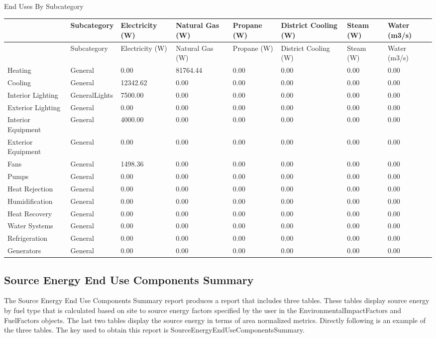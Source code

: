 End Uses By Subcategory

{\scriptsize
\begin{longtable}[c]{>{\raggedright}p{0.75in}>{\raggedright}p{0.75in}>{\raggedright}p{0.75in}>{\raggedright}p{0.75in}>{\raggedright}p{0.75in}>{\raggedright}p{0.75in}>{\raggedright}p{0.75in}>{\raggedright}p{0.75in}}
\toprule
~ & Subcategory & Electricity (W) & Natural Gas (W) & Propane (W) & District Cooling (W) & Steam (W) & Water (m3/s) \tabularnewline
\midrule
\endfirsthead

\toprule
~ & Subcategory & Electricity (W) & Natural Gas (W) & Propane (W) & District Cooling (W) & Steam (W) & Water (m3/s) \tabularnewline
\midrule
\endhead

Heating & General & 0.00 & 81764.44 & 0.00 & 0.00 & 0.00 & 0.00 \tabularnewline
Cooling & General & 12342.62 & 0.00 & 0.00 & 0.00 & 0.00 & 0.00 \tabularnewline
Interior Lighting & GeneralLights & 7500.00 & 0.00 & 0.00 & 0.00 & 0.00 & 0.00 \tabularnewline
Exterior Lighting & General & 0.00 & 0.00 & 0.00 & 0.00 & 0.00 & 0.00 \tabularnewline
Interior Equipment & General & 4000.00 & 0.00 & 0.00 & 0.00 & 0.00 & 0.00 \tabularnewline
Exterior Equipment & General & 0.00 & 0.00 & 0.00 & 0.00 & 0.00 & 0.00 \tabularnewline
Fans & General & 1498.36 & 0.00 & 0.00 & 0.00 & 0.00 & 0.00 \tabularnewline
Pumps & General & 0.00 & 0.00 & 0.00 & 0.00 & 0.00 & 0.00 \tabularnewline
Heat Rejection & General & 0.00 & 0.00 & 0.00 & 0.00 & 0.00 & 0.00 \tabularnewline
Humidification & General & 0.00 & 0.00 & 0.00 & 0.00 & 0.00 & 0.00 \tabularnewline
Heat Recovery & General & 0.00 & 0.00 & 0.00 & 0.00 & 0.00 & 0.00 \tabularnewline
Water Systems & General & 0.00 & 0.00 & 0.00 & 0.00 & 0.00 & 0.00 \tabularnewline
Refrigeration & General & 0.00 & 0.00 & 0.00 & 0.00 & 0.00 & 0.00 \tabularnewline
Generators & General & 0.00 & 0.00 & 0.00 & 0.00 & 0.00 & 0.00 \tabularnewline
\bottomrule
\end{longtable}}

\subsection{Source Energy End Use Components Summary}\label{source-energy-end-use-components-summary}

The Source Energy End Use Components Summary report produces a report that includes three tables. These tables display source energy by fuel type that is calculated based on site to source energy factors specified by the user in the EnvironmentalImpactFactors and FuelFactors objects. The last two tables display the source energy in terms of area normalized metrics. Directly following is an example of the three tables. The key used to obtain this report is SourceEnergyEndUseComponentsSummary.

